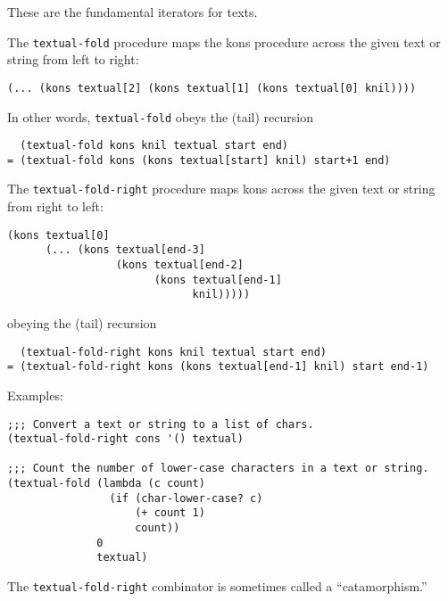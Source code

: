 \begin{entry}{%
  }

  These are the fundamental iterators for
  texts.

  The \texttt{textual-fold} procedure maps the kons procedure across
  the given text or string from left to right:

\begin{verbatim}
(... (kons textual[2] (kons textual[1] (kons textual[0] knil))))
\end{verbatim}

  In other words, \texttt{textual-fold} obeys the (tail) recursion

\begin{verbatim}
  (textual-fold kons knil textual start end)
= (textual-fold kons (kons textual[start] knil) start+1 end)
\end{verbatim}

  The \texttt{textual-fold-right} procedure maps kons across the given
  text or string from right to left:

\begin{verbatim}
(kons textual[0]
      (... (kons textual[end-3]
                 (kons textual[end-2]
                       (kons textual[end-1]
                             knil)))))
\end{verbatim}

  obeying the (tail) recursion

\begin{verbatim}
  (textual-fold-right kons knil textual start end)
= (textual-fold-right kons (kons textual[end-1] knil) start end-1)
\end{verbatim}

  Examples:

\begin{verbatim}
;;; Convert a text or string to a list of chars.
(textual-fold-right cons '() textual)

;;; Count the number of lower-case characters in a text or string.
(textual-fold (lambda (c count)
                (if (char-lower-case? c)
                    (+ count 1)
                    count))
              0
              textual)
\end{verbatim}

  The \texttt{textual-fold-right} combinator is sometimes called a
  ``catamorphism.''
\end{entry}

